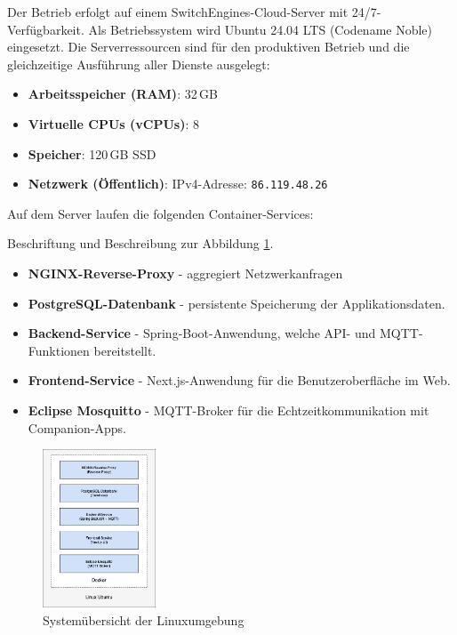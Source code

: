 \documentclass[12pt,a4paper]{report}
\begin{document}
        Der Betrieb erfolgt auf einem SwitchEngines-Cloud-Server mit 24/7-Verfügbarkeit.
        Als Betriebssystem wird Ubuntu 24.04 LTS (Codename Noble) eingesetzt.
        Die Serverressourcen sind für den produktiven Betrieb und die gleichzeitige Ausführung aller Dienste ausgelegt:

        \begin{itemize}
            \item \textbf{Arbeitsspeicher (RAM)}: 32\,GB
            \item \textbf{Virtuelle CPUs (vCPUs)}: 8
            \item \textbf{Speicher}: 120\,GB SSD
            \item \textbf{Netzwerk (Öffentlich)}: IPv4-Adresse: \texttt{86.119.48.26}
        \end{itemize}

        Auf dem Server laufen die folgenden Container-Services:

        Beschriftung und Beschreibung zur Abbildung \ref{fig:deployment-system}.
        \begin{itemize}
            \item \textbf{NGINX-Reverse-Proxy} - aggregiert Netzwerkanfragen
            \item \textbf{PostgreSQL-Datenbank} - persistente Speicherung der Applikationsdaten.
            \item \textbf{Backend-Service} - Spring-Boot-Anwendung, welche API- und MQTT-Funktionen bereitstellt.
            \item \textbf{Frontend-Service} - Next.js-Anwendung für die Benutzeroberfläche im Web.
            \item \textbf{Eclipse Mosquitto} - MQTT-Broker für die Echtzeitkommunikation mit Companion-Apps.
        \end{itemize}

        \begin{figure}[H]
          \centering
          \includegraphics[width=0.3\textwidth]{../figures/deployment-system.drawio.png}
          \caption{Systemübersicht der Linuxumgebung}
          \label{fig:deployment-system}
        \end{figure}
\end{document}
